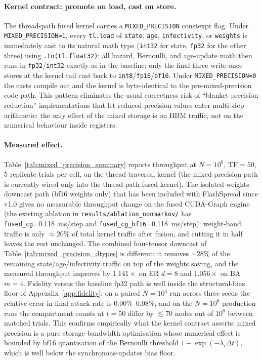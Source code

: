\paragraph{Kernel contract: promote on load, cast on store.}
The thread-path fused kernel carries a \texttt{MIXED\_PRECISION} constexpr flag. Under \texttt{MIXED\_PRECISION=1}, every \texttt{tl.load} of \texttt{state}, \texttt{age}, \texttt{infectivity}, or \texttt{weights} is immediately cast to its natural math type (\texttt{int32} for state, \texttt{fp32} for the other three) using \texttt{.to(tl.float32)}; all hazard, Bernoulli, and age-update math then runs in \texttt{fp32}/\texttt{int32} exactly as in the baseline; only the final three write-once stores at the kernel tail cast back to \texttt{int8}/\texttt{fp16}/\texttt{bf16}. Under \texttt{MIXED\_PRECISION=0} the casts compile out and the kernel is byte-identical to the pre-mixed-precision code path. This pattern eliminates the usual correctness risk of ``blanket precision reduction'' implementations that let reduced-precision values enter multi-step arithmetic: the only effect of the mixed storage is on HBM traffic, not on the numerical behaviour inside registers.

\paragraph{Measured effect.}
Table~\ref{tab:mixed_precision_summary} reports throughput at $N = 10^6$, $\mathrm{TF}=50$, 5 replicate trials per cell, on the thread-traversal kernel (the mixed-precision path is currently wired only into the thread-path fused kernel). The isolated-weights downcast path (bf16 weights only) that has been included with FlashSpread since v1.0 gives no measurable throughput change on the fused CUDA-Graph engine (the existing ablation in \texttt{results/ablation\_nonmarkov/} has \texttt{fused\_cg}=0.118~ms/step and \texttt{fused\_cg\_bf16}=0.118~ms/step): weight-band traffic is only $\approx 20\%$ of total kernel traffic after fusion, and cutting it in half leaves the rest unchanged. The combined four-tensor downcast of Table~\ref{tab:mixed_precision_dtypes} is different: it removes $\sim\!28\%$ of the remaining state/age/infectivity traffic on top of the weights saving, and the measured throughput improves by $1.141\times$ on ER $d{=}8$ and $1.056\times$ on BA $m{=}4$. Fidelity versus the baseline fp32 path is well inside the structural-bias floor of Appendix~\ref{app:fidelity}: on a paired $N=10^4$ run across three seeds the relative error in final attack rate is $0.00\%$--$0.08\%$, and on the $N=10^6$ production runs the compartment counts at $t=50$ differ by $\lesssim\!70$ nodes out of $10^6$ between matched trials. This confirms empirically what the kernel contract asserts: mixed precision is a pure storage-bandwidth optimisation whose numerical effect is bounded by bf16 quantisation of the Bernoulli threshold $1 - \exp(-\lambda_i \Delta t)$, which is well below the synchronous-updates bias floor.

